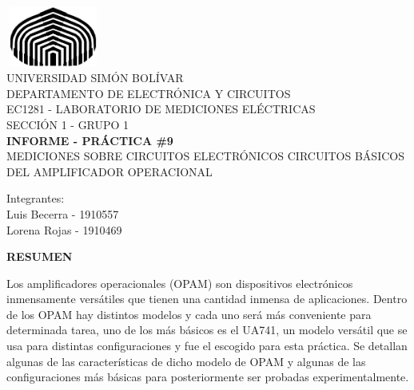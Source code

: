 \documentclass[12pt]{article}
\begin{document}
	
	\thispagestyle{empty}
	
	\begin{center}
		\includegraphics[width=3.1cm,height=2cm]{logo}\\
		UNIVERSIDAD SIMÓN BOLÍVAR\\
		DEPARTAMENTO DE ELECTRÓNICA Y CIRCUITOS\\
		EC1281 - LABORATORIO DE MEDICIONES ELÉCTRICAS\\
		SECCIÓN 1 - GRUPO 1\\
		
		\vspace{6cm}
		\textbf{\Large INFORME - PRÁCTICA \#9}\\
		MEDICIONES SOBRE CIRCUITOS ELECTRÓNICOS CIRCUITOS BÁSICOS DEL AMPLIFICADOR OPERACIONAL\\
	\end{center}
	
	\begin{flushleft}
		\vspace{9cm}
		\hfill Integrantes:\\
		\hfill {\large Luis Becerra - 1910557}\\
		\hfill {\large Lorena Rojas - 1910469}\\
	\end{flushleft}
	
	\newpage
	
        \setcounter{page}{2}
	
	\begin{center}
		\textbf{\large RESUMEN}\\
	\end{center}
	
	Los amplificadores operacionales (OPAM) son dispositivos electrónicos inmensamente versátiles que tienen una cantidad inmensa de aplicaciones. Dentro de los OPAM hay distintos modelos y cada uno será más conveniente para determinada tarea, uno de los más básicos es el UA741, un modelo versátil que se usa para distintas configuraciones y fue el escogido para esta práctica. Se detallan algunas de las características de dicho modelo de OPAM y algunas de las configuraciones más básicas para posteriormente ser probadas experimentalmente.
	
	\newpage
	
\end{document}

